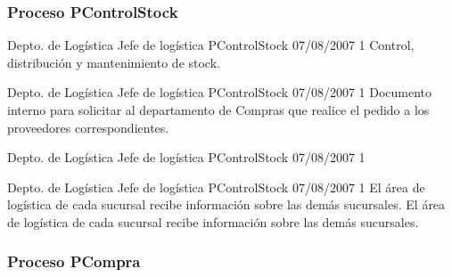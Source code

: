 \subsubsection{Proceso \textsf{PControlStock}}

\begin{apx1}
{Depto. de Logística}
{Jefe de logística}
{PControlStock}
{07/08/2007}
{1}
{Control, distribución y mantenimiento de stock.}
\end{apx1}

\begin{apx2}
{Depto. de Logística}
{Jefe de logística}
{PControlStock}
{07/08/2007}
{1}
    {Documento interno para solicitar al departamento de Compras que realice el pedido a los proveedores correspondientes.}
\end{apx2}

\begin{apx3}
{Depto. de Logística}
{Jefe de logística}
{PControlStock}
{07/08/2007}
{1}
\end{apx3}

\begin{apx4}
{Depto. de Logística}
{Jefe de logística}
{PControlStock}
{07/08/2007}
{1}
    {El área de logística de cada sucursal recibe información sobre las demás sucursales.}
    {El área de logística de cada sucursal recibe información sobre las demás sucursales.}
\end{apx4}


\subsubsection{Proceso \textsf{PCompra}}

